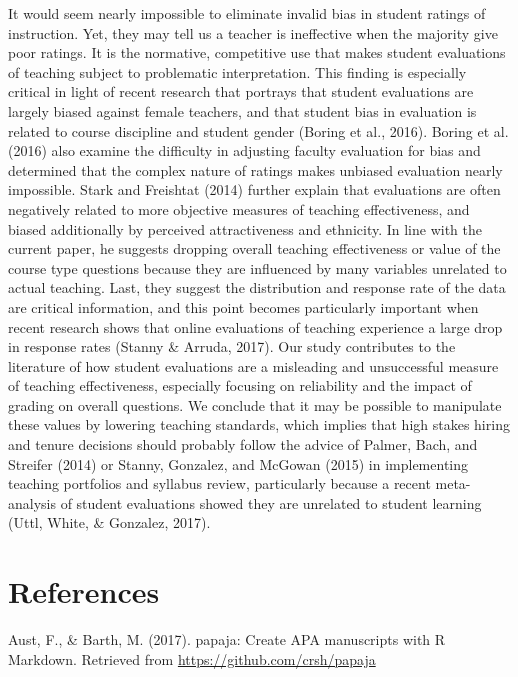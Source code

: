 \documentclass[,man]{apa6}
\theoremstyle{definition}
\theoremstyle{definition}
\theoremstyle{definition}
\theoremstyle{remark}
\begin{document}
It would seem nearly impossible to eliminate invalid bias in student
ratings of instruction. Yet, they may tell us a teacher is ineffective
when the majority give poor ratings. It is the normative, competitive
use that makes student evaluations of teaching subject to problematic
interpretation. This finding is especially critical in light of recent
research that portrays that student evaluations are largely biased
against female teachers, and that student bias in evaluation is related
to course discipline and student gender (Boring et al., 2016). Boring et
al. (2016) also examine the difficulty in adjusting faculty evaluation
for bias and determined that the complex nature of ratings makes
unbiased evaluation nearly impossible. Stark and Freishtat (2014)
further explain that evaluations are often negatively related to more
objective measures of teaching effectiveness, and biased additionally by
perceived attractiveness and ethnicity. In line with the current paper,
he suggests dropping overall teaching effectiveness or value of the
course type questions because they are influenced by many variables
unrelated to actual teaching. Last, they suggest the distribution and
response rate of the data are critical information, and this point
becomes particularly important when recent research shows that online
evaluations of teaching experience a large drop in response rates
(Stanny \& Arruda, 2017). Our study contributes to the literature of how
student evaluations are a misleading and unsuccessful measure of
teaching effectiveness, especially focusing on reliability and the
impact of grading on overall questions. We conclude that it may be
possible to manipulate these values by lowering teaching standards,
which implies that high stakes hiring and tenure decisions should
probably follow the advice of Palmer, Bach, and Streifer (2014) or
Stanny, Gonzalez, and McGowan (2015) in implementing teaching portfolios
and syllabus review, particularly because a recent meta-analysis of
student evaluations showed they are unrelated to student learning (Uttl,
White, \& Gonzalez, 2017).

\newpage

\hypertarget{references}{%
\section{References}\label{references}}

\setlength{\parindent}{-0.5in}
\setlength{\leftskip}{0.5in}

\hypertarget{refs}{}
\leavevmode\hypertarget{ref-Aust2017}{}%
Aust, F., \& Barth, M. (2017). papaja: Create APA manuscripts with R
Markdown. Retrieved from \url{https://github.com/crsh/papaja}
\end{document}
